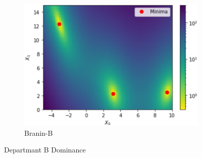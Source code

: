 \documentclass[conference]{IEEEtran}
\begin{document}
\begin{figure}[!t]
\begin{subfigure}{.275\textwidth}
  \includegraphics[width=.6\linewidth]{braninb.png}
  \caption{Branin-B}
  \label{fig:figur:12}
\end{subfigure}
\caption{Departmant B Dominance}
\end{figure}

% 
\end{document}
